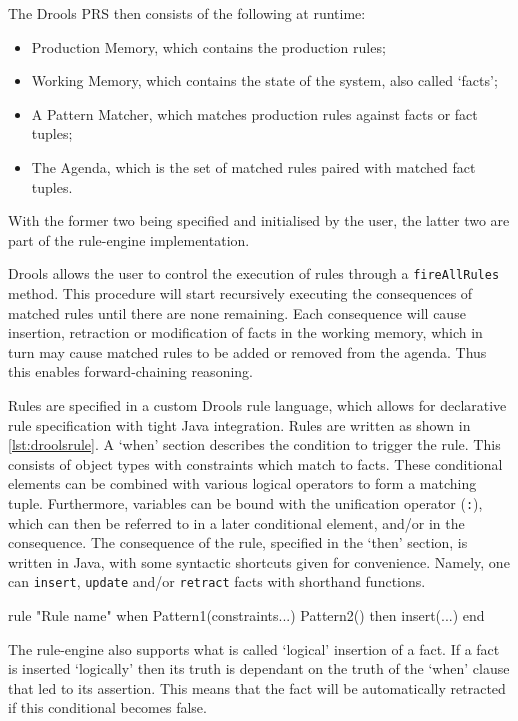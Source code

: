 The Drools \ac{PRS} then consists of the following at runtime:
\begin{itemize}
	\item Production Memory, which contains the production rules;
	\item Working Memory, which contains the state of the system, also called `facts';
	\item A Pattern Matcher, which matches production rules against facts or fact
	tuples;
	\item The Agenda, which is the set of matched rules paired with matched fact
	tuples.
\end{itemize}

With the former two being specified and initialised by the user, the latter two
are part of the rule-engine implementation.

Drools allows the user to control the execution of rules through a \texttt{fireAllRules} method.
This procedure will start recursively executing the consequences of matched
rules until there are none remaining. Each consequence will cause insertion,
retraction or modification of facts in the working memory, which in turn may
cause matched rules to be added or removed from the agenda. Thus this enables
forward-chaining reasoning.

Rules are specified in a custom Drools rule language, which allows for
declarative rule specification with tight Java integration. Rules are written as
shown in \autoref{lst:droolsrule}. A `when' section describes the condition
to trigger the rule. This consists of object types with constraints which match
to facts. These conditional elements can be combined with various logical
operators to form a matching tuple. Furthermore, variables can be bound with the
unification operator (\texttt{:}), which can then be referred to in a later
conditional element, and/or in the consequence. The consequence of the rule,
specified in the `then' section, is written in Java, with some syntactic
shortcuts given for convenience. Namely, one can \texttt{insert}, \texttt{update}
and/or \texttt{retract} facts with shorthand functions.

\begin{drools}[label=lst:droolsrule,caption=Syntax of a Drools rule.]
rule "Rule name"
when
	Pattern1(constraints...)
	Pattern2()
then
	insert(...)
end
\end{drools}

The rule-engine also supports what is called `logical' insertion of a fact. If a
fact is inserted `logically' then its truth is dependant on the truth of the
`when' clause that led to its assertion. This means that the fact will be
automatically retracted if this conditional becomes false.

